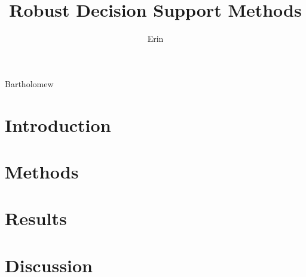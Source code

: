 \documentclass[table]{dissertation}
\begin{document}
\title[A Comparative Analysis]{Robust Decision Support Methods}
\author{Erin}{Bartholomew}

\frontmatter



%


\tableofcontents

\listoffigures
\listoftables

\mainmatter

\newpage

\thumbtrue

\setlength{\tabcolsep}{5pt}

\part{Introduction} \label{part-introduce}




\part{Methods} \label{part-develop}







\part{Results} \label{part-analysis}



\part{Discussion} \label{part-discussion}




\clearpage
\pagestyle{plain}
\printbibliography[title=References]

\appendix 
\end{document}

